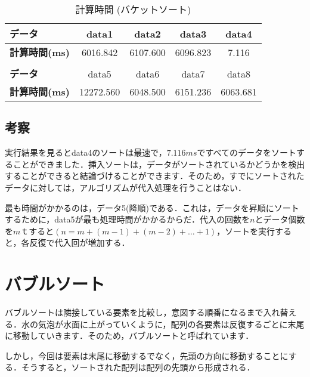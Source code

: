 \documentclass[a4j, titlepage]{jarticle}
\begin{document}
            \begin{table}[tbh]
                \caption{計算時間 (バケットソート)}
                \label{tab:insertion}
                \begin{center}
                    \begin{tabular}{lcccc}
                        \hline
                        \textbf{データ} & data1 & data2 &data3 &data4 \\ \hline
                        \textbf{計算時間(ms)} & 6016.842 & 6107.600 & 6096.823 & 7.116\\ \hline
                        \\ \hline
                        \textbf{データ} & data5 &data6 &data7 &data8\\ \hline
                        \textbf{計算時間(ms)} & 12272.560 & 6048.500 & 6151.236 & 6063.681\\ \hline
                    \end{tabular}
                \end{center}
            \end{table}
        
        \subsection{考察}
            実行結果を見るとdata4のソートは最速で，$7.116ms$ですべてのデータをソートすることができました．挿入ソートは，データがソートされているかどうかを検出することができると結論づけることができます．そのため，すでにソートされたデータに対しては，アルゴリズムが代入処理を行うことはない．
            
            最も時間がかかるのは，データ5(降順)である．これは，データを昇順にソートするために，data5が最も処理時間がかかるからだ．代入の回数を$n$とデータ個数を$m$ｔすると$( n = m + (m-1) + (m-2) + \dots + 1)$，ソートを実行すると，各反復で代入回が増加する．


    \section{バブルソート}
        バブルソートは隣接している要素を比較し，意図する順番になるまで入れ替える．水の気泡が水面に上がっていくように，配列の各要素は反復するごとに末尾に移動していきます．そのため，バブルソートと呼ばれています．

        しかし，今回は要素は末尾に移動するでなく，先頭の方向に移動することにする．そうすると，ソートされた配列は配列の先頭から形成される．
\end{document}
